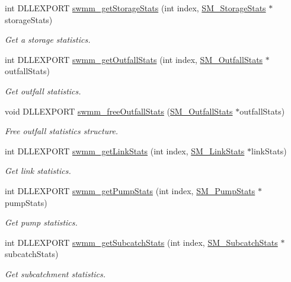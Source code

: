 \begin{DoxyCompactItemize}
int D\+L\+L\+E\+X\+P\+O\+RT \hyperlink{group__tkfuncs_gaec84d7c193dff925aa02505b0977868d}{swmm\+\_\+get\+Storage\+Stats} (int index, \hyperlink{struct_s_m___storage_stats}{S\+M\+\_\+\+Storage\+Stats} $\ast$storage\+Stats)
\begin{DoxyCompactList}\small\item\em Get a storage statistics. \end{DoxyCompactList}\item 
int D\+L\+L\+E\+X\+P\+O\+RT \hyperlink{group__tkfuncs_ga290977608917eaf93fa259aeb080880a}{swmm\+\_\+get\+Outfall\+Stats} (int index, \hyperlink{struct_s_m___outfall_stats}{S\+M\+\_\+\+Outfall\+Stats} $\ast$outfall\+Stats)
\begin{DoxyCompactList}\small\item\em Get outfall statistics. \end{DoxyCompactList}\item 
void D\+L\+L\+E\+X\+P\+O\+RT \hyperlink{group__tkfuncs_ga24874b7dc37c161521f0c14899c2157d}{swmm\+\_\+free\+Outfall\+Stats} (\hyperlink{struct_s_m___outfall_stats}{S\+M\+\_\+\+Outfall\+Stats} $\ast$outfall\+Stats)
\begin{DoxyCompactList}\small\item\em Free outfall statistics structure. \end{DoxyCompactList}\item 
int D\+L\+L\+E\+X\+P\+O\+RT \hyperlink{group__tkfuncs_ga4895dbf445e9abd6d7e9eb72515c49e0}{swmm\+\_\+get\+Link\+Stats} (int index, \hyperlink{struct_s_m___link_stats}{S\+M\+\_\+\+Link\+Stats} $\ast$link\+Stats)
\begin{DoxyCompactList}\small\item\em Get link statistics. \end{DoxyCompactList}\item 
int D\+L\+L\+E\+X\+P\+O\+RT \hyperlink{group__tkfuncs_gafb2a5a295fb4a038edb2a36eab8c576d}{swmm\+\_\+get\+Pump\+Stats} (int index, \hyperlink{struct_s_m___pump_stats}{S\+M\+\_\+\+Pump\+Stats} $\ast$pump\+Stats)
\begin{DoxyCompactList}\small\item\em Get pump statistics. \end{DoxyCompactList}\item 
int D\+L\+L\+E\+X\+P\+O\+RT \hyperlink{group__tkfuncs_ga07cf0c633357b86bfcd0886fed0ae2fb}{swmm\+\_\+get\+Subcatch\+Stats} (int index, \hyperlink{struct_s_m___subcatch_stats}{S\+M\+\_\+\+Subcatch\+Stats} $\ast$subcatch\+Stats)
\begin{DoxyCompactList}\small\item\em Get subcatchment statistics. \end{DoxyCompactList}\item 

\end{DoxyCompactItemize}
